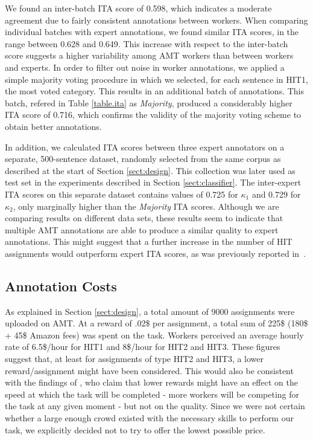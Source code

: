 \documentclass[11pt,letterpaper]{article}
\begin{document}
We found an inter-batch ITA score of 0.598, which indicates a moderate agreement due to fairly consistent annotations between workers. When comparing individual batches with expert annotations, we found similar ITA scores, in the range between 0.628 and 0.649. This increase with respect to the inter-batch score suggests a higher variability among AMT workers than between workers and experts. 
In order to filter out noise in worker annotations, we applied a simple majority voting procedure in which we selected, for each sentence in HIT1, the most voted category. This results in an additional batch of annotations. This batch, refered in Table \ref{table.ita} as \textit{Majority}, produced a considerably higher ITA score of 0.716, which confirms the validity of the majority voting scheme to obtain better annotations.

In addition, we calculated ITA scores between three expert annotators on a separate, 500-sentence dataset, randomly selected from the same corpus as described at the start of Section \ref{sect:design}. This collection was later used as test set in the experiments described in Section \ref{sect:classifier}. The inter-expert ITA scores on this separate dataset contains values of 0.725 for $\kappa_{1}$ and 0.729 for $\kappa_{2}$, only marginally higher than the \textit{Majority} ITA scores. Although we are comparing results on different data sets, these results seem to indicate that multiple AMT annotations are able to produce a similar quality to expert annotations. This might suggest that a further increase in the number of HIT assignments would outperform expert ITA scores, as was previously reported in~\cite{snow_cheap_2008}.

\subsection{Annotation Costs}
\label{sect:costs}

As explained in Section \ref{sect:design}, a total amount of 9000 assignments were uploaded on AMT. At a reward of .02\$ per assignment, a total sum of 225\$ (180\$ + 45\$ Amazon fees) was spent on the task. Workers perceived an average hourly rate of 6.5\$/hour for HIT1 and 8\$/hour for HIT2 and HIT3. These figures suggest that, at least for assignments of type HIT2 and HIT3, a lower reward/assignment might have been considered. This would also be consistent with the findings of \cite{mason_financial_2009}, who claim that lower rewards might have an effect on the speed at which the task will be completed - more workers will be competing for the task at any given moment - but not on the quality. Since we were not certain whether a large enough crowd existed with the necessary skills to perform our task, we explicitly decided not to try to offer the lowest possible price.
\end{document}
